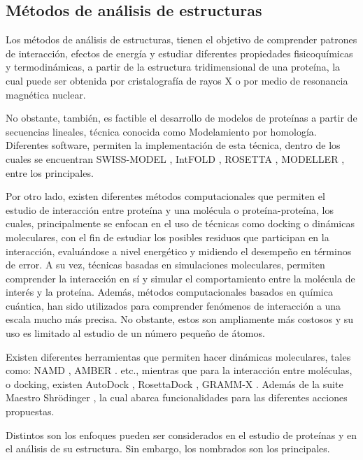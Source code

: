 \subsection{Métodos de análisis de estructuras}

Los métodos de análisis de estructuras, tienen el objetivo de comprender patrones de interacción, efectos de energía y estudiar diferentes propiedades fisicoquímicas y termodinámicas, a partir de la estructura tridimensional de una proteína, la cual puede ser obtenida por cristalografía de rayos X o por medio de resonancia magnética nuclear.

No obstante, también, es factible el desarrollo de modelos de proteínas a partir de secuencias lineales, técnica conocida como Modelamiento por homología. Diferentes software, permiten la implementación de esta técnica, dentro de los cuales se encuentran SWISS-MODEL \cite{Guex1997}, IntFOLD \cite{mcguffin2015intfold}, ROSETTA \cite{leaver2011rosetta3}, MODELLER \cite{eswar2006comparative}, entre los principales. 

Por otro lado, existen diferentes métodos computacionales que permiten el estudio de interacción entre proteína y una molécula o proteína-proteína, los cuales, principalmente se enfocan en el uso de técnicas como docking o dinámicas moleculares, con el fin de estudiar los posibles residuos que participan en la interacción, evaluándose a nivel energético y midiendo el desempeño en términos de error. A su vez, técnicas basadas en simulaciones moleculares, permiten comprender la interacción en sí y simular el comportamiento entre la molécula de interés y la proteína. Además, métodos computacionales basados en química cuántica, han sido utilizados para comprender fenómenos de interacción a una escala mucho más precisa. No obstante, estos son ampliamente más costosos y su uso es limitado al estudio de un número pequeño de átomos. 

Existen diferentes herramientas que permiten hacer dinámicas moleculares, tales como: NAMD \cite{phillips2005scalable}, AMBER \cite{case2005amber}. etc., mientras que para la interacción entre moléculas, o docking, existen AutoDock \cite{trott2010autodock}, RosettaDock \cite{lyskov2008rosettadock}, GRAMM-X \cite{tovchigrechko2006gramm}. Además de la suite Maestro Shr\"odinger \cite{release20161}, la cual abarca funcionalidades para las diferentes acciones propuestas. 

Distintos son los enfoques pueden ser considerados en el estudio de proteínas y en el análisis de su estructura. Sin embargo, los nombrados son los principales.
 
